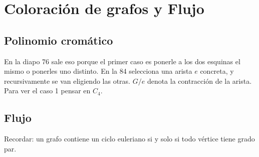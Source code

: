 \documentclass[TGyGC.tex]{subfiles}
\begin{document}
\chapter{Coloración de grafos y Flujo}
\section{Polinomio cromático}
En la diapo 76 sale eso porque el primer caso es ponerle a los dos esquinas el mismo o ponerles uno distinto. En la 84 selecciona una arista $e$ concreta, y recursivamente se van eligiendo las otras. $G/e$ denota la contracción de la arista. Para ver el caso 1 pensar en $C_4$. 

\section{Flujo}
Recordar: un grafo contiene un ciclo euleriano si y solo si todo vértice tiene grado par. 
\end{document}
